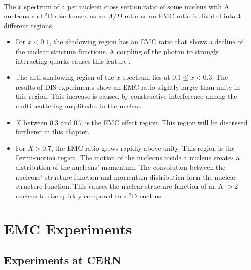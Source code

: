 \paragraph{}The $x$ spectrum of a per nucleon cross section ratio of some nucleus with A nucleons and $^2$D also known as an $A/D$ ratio or an EMC ratio is divided into 4 different regions. 
\begin{itemize}
	\item For $x < 0.1$, the shadowing region has an EMC ratio that shows a decline of the nuclear stricture functions. A coupling of the photon to strongly interacting quarks causes this feature \cite{PnN}.
	\item The anti-shadowing region of the $x$ spectrum lies at $0.1 \leq x < 0.3 $. The results of DIS experiments show an EMC ratio slightly larger than unity in this region. This increase is caused by constructive interference among the multi-scattering amplitudes in the nucleus \cite{shadowing}.
	\item $X$ between 0.3 and 0.7 is the EMC effect region. This region will be discussed furtherer in this chapter.
	\item For $X > 0.7$, the EMC ratio grows rapidly above unity.  This region is the Fermi-motion region. The  motion of the nucleons inside a nucleus creates a distribution of the nucleons'  momentum. The convolution between the nucleons' structure function and momentum distribution form the nuclear structure function. This causes the nuclear structure function of an A $> 2$ nucleus to rise quickly compared to a $^2$D nucleus \cite{Ajth,PnN}. 
\end{itemize}
\section{EMC Experiments}
\subsection{Experiments at CERN}
